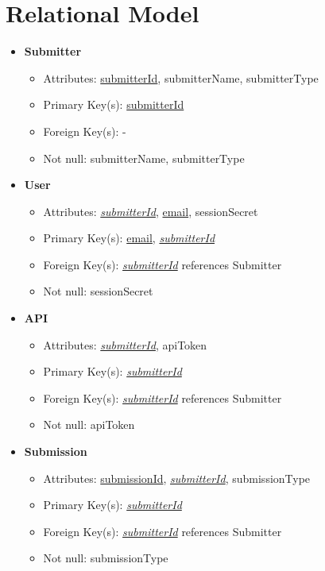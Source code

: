 \documentclass{article}
\begin{document}
\section{Relational Model}
    \begin{itemize}
        \item \textbf{Submitter}        
        \begin{itemize}
            \item Attributes: \underline{submitterId}, submitterName, submitterType
            \item Primary Key(s): \underline{submitterId}
            \item Foreign Key(s): -
            \item Not null: submitterName, submitterType
        \end{itemize}

        \item \textbf{User}
        \begin{itemize}
            \item Attributes: \underline{\textit{submitterId}}, \underline{email}, sessionSecret
            \item Primary Key(s): \underline{email}, \underline{\textit{submitterId}}
            \item Foreign Key(s): \underline{\textit{submitterId}} references Submitter
            \item Not null: sessionSecret
        \end{itemize}

        \item \textbf{API}
        \begin{itemize}
            \item Attributes: \underline{\textit{submitterId}}, apiToken
            \item Primary Key(s): \underline{\textit{submitterId}}
            \item Foreign Key(s): \underline{\textit{submitterId}} references Submitter
            \item Not null: apiToken
        \end{itemize}

        \item \textbf{Submission}
        \begin{itemize}
            \item Attributes: \underline{submissionId}, \underline{\textit{submitterId}}, submissionType
            \item Primary Key(s): \underline{\textit{submitterId}}
            \item Foreign Key(s): \underline{\textit{submitterId}} references Submitter
            \item Not null: submissionType
        \end{itemize}


\end{itemize}
\end{document}
